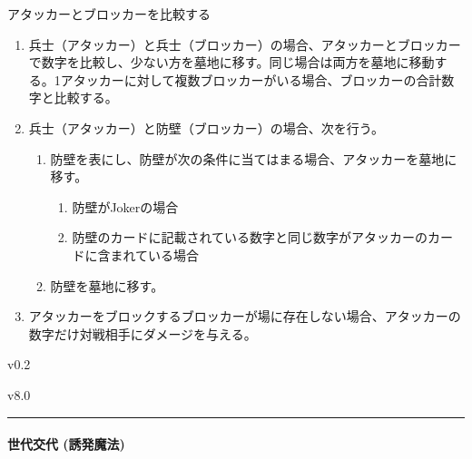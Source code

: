 \documentclass[letterpaper,10pt,dvipdfmx]{sphinxmanual}
\begin{document}
\sphinxAtStartPar
アタッカーとブロッカーを比較する
\begin{enumerate}
%
\item {} 
\sphinxAtStartPar
兵士（アタッカー）と兵士（ブロッカー）の場合、アタッカーとブロッカーで数字を比較し、少ない方を墓地に移す。同じ場合は両方を墓地に移動する。1アタッカーに対して複数ブロッカーがいる場合、ブロッカーの合計数字と比較する。

\item {} 
\sphinxAtStartPar
兵士（アタッカー）と防壁（ブロッカー）の場合、次を行う。
\begin{enumerate}
%
\item {} 
\sphinxAtStartPar
防壁を表にし、防壁が次の条件に当てはまる場合、アタッカーを墓地に移す。
\begin{enumerate}
%
\item {} 
\sphinxAtStartPar
防壁がJokerの場合

\item {} 
\sphinxAtStartPar
防壁のカードに記載されている数字と同じ数字がアタッカーのカードに含まれている場合

\end{enumerate}

\item {} 
\sphinxAtStartPar
防壁を墓地に移す。

\end{enumerate}

\item {} 
\sphinxAtStartPar
アタッカーをブロックするブロッカーが場に存在しない場合、アタッカーの数字だけ対戦相手にダメージを与える。

\end{enumerate}

\sphinxAtStartPar
{}  v0.2

\sphinxAtStartPar
{}  v8.0


\bigskip\hrule\bigskip



\paragraph{世代交代 (誘発魔法)}
\label{\detokenize{auto/actionlist:act-nextgeneration}}\label{\detokenize{auto/actionlist:id10}}
\sphinxAtStartPar
{}
\end{document}
